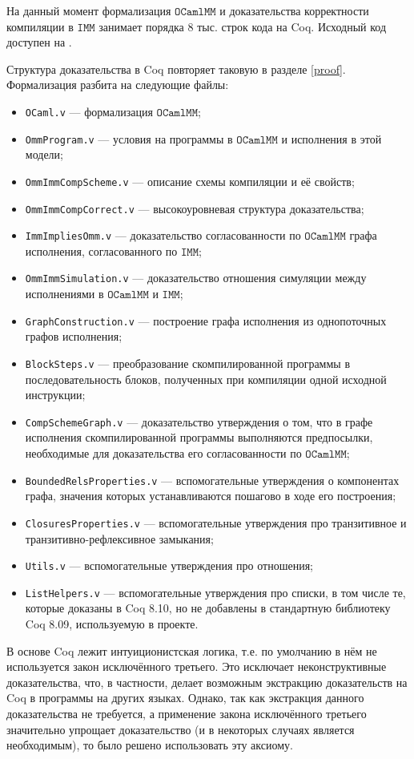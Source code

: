\documentclass[14pt]{matmex-diploma-custom}
\newcommand{\IMM}{\mathtt{IMM}}
\newcommand{\OMM}{\mathtt{OCaml}\allowbreak \mathtt{MM}}
\begin{document}
На данный момент формализация $\OMM$ и доказательства корректности компиляции в $\IMM$ занимает порядка 8 тыс. строк кода на Coq. Исходный код доступен на \cite{imm-repo}.

Структура доказательства в Coq повторяет таковую в разделе \ref{proof}. Формализация разбита на следующие файлы:

\begin{itemize}
\item \verb|OCaml.v| --- формализация $\OMM$;
\item \verb|OmmProgram.v| --- условия на программы в $\OMM$ и исполнения в этой модели;  
\item \verb|OmmImmCompScheme.v| --- описание схемы компиляции и её свойств;
\item \verb|OmmImmCompCorrect.v| --- высокоуровневая структура доказательства;
\item \verb|ImmImpliesOmm.v| --- доказательство согласованности по $\OMM$ графа исполнения, согласованного по $\IMM$;  
\item \verb|OmmImmSimulation.v| --- доказательство отношения симуляции между исполнениями в $\OMM$ и $\IMM$;
\item \verb|GraphConstruction.v| --- построение графа исполнения из однопоточных графов исполнения;
\item \verb|BlockSteps.v| --- преобразование скомпилированной программы в последовательность блоков, полученных при компиляции одной исходной инструкции;
\item \verb|CompSchemeGraph.v| --- доказательство утверждения о том, что в графе исполнения скомпилированной программы выполняются предпосылки, необходимые для доказательства его согласованности по $\OMM$;
\item \verb|BoundedRelsProperties.v| --- вспомогательные утверждения о компонентах графа, значения которых устанавливаются пошагово в ходе его построения;
\item \verb|ClosuresProperties.v| --- вспомогательные утверждения про транзитивное и транзитивно-рефлексивное замыкания;
\item \verb|Utils.v| --- вспомогательные утверждения про отношения;
\item \verb|ListHelpers.v| --- вспомогательные утверждения про списки, в том числе те, которые доказаны в Coq 8.10, но не добавлены в стандартную библиотеку Coq 8.09, используемую в проекте.
\end{itemize}

В основе Coq лежит интуиционистская логика, т.е. по умолчанию в нём не используется закон исключённого третьего. Это исключает неконструктивные доказательства, что, в частности, делает возможным экстракцию доказательств на Coq в программы на других языках. Однако, так как экстракция данного доказательства не требуется, а применение закона исключённого третьего значительно упрощает доказательство (и в некоторых случаях является необходимым), то было решено использовать эту аксиому.
\end{document}
